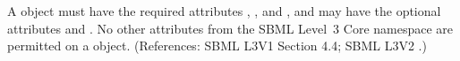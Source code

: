 A \Unit object must have the required attributes ,
,  and , and may have the
optional attributes   and .  No other
attributes from the SBML Level~3 Core namespace are permitted on a \Unit
object.  (References: SBML L3V1 Section 4.4; SBML L3V2 .)

